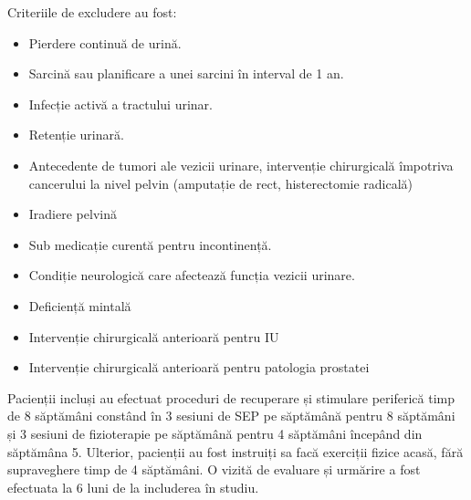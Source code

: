 \documentclass[12pt]{article}
\begin{document}
 Criteriile de excludere au fost:
  \begin{itemize}
    \item Pierdere continuă de urină.
    \item Sarcină sau planificare a unei sarcini în interval de 1 an.
    \item Infecție activă a tractului urinar.
    \item Retenție urinară.
    \item Antecedente de tumori ale vezicii urinare, intervenție chirurgicală împotriva cancerului la nivel pelvin (amputație de rect, histerectomie radicală)
    \item Iradiere pelvină
    \item Sub medicație curentă pentru incontinență.
    \item Condiție neurologică care afectează funcția vezicii urinare.
    \item Deficiență mintală 
    \item Intervenție chirurgicală anterioară pentru IU
    \item Intervenție chirurgicală anterioară pentru patologia prostatei 
   \end{itemize}
  Pacienții incluși au efectuat proceduri de recuperare și stimulare periferică timp de 8 săptămâni constând în 3 sesiuni de \ac{SEP} pe săptămână pentru 8 săptămâni și 3 sesiuni de fizioterapie pe săptămână pentru 4 săptămâni începând din săptămâna 5. Ulterior, pacienții au fost instruiți sa facă exerciții fizice acasă, fără supraveghere timp de 4 săptămâni. O vizită de evaluare și urmărire a fost efectuata la 6 luni de la includerea în studiu.
  
\end{document}
